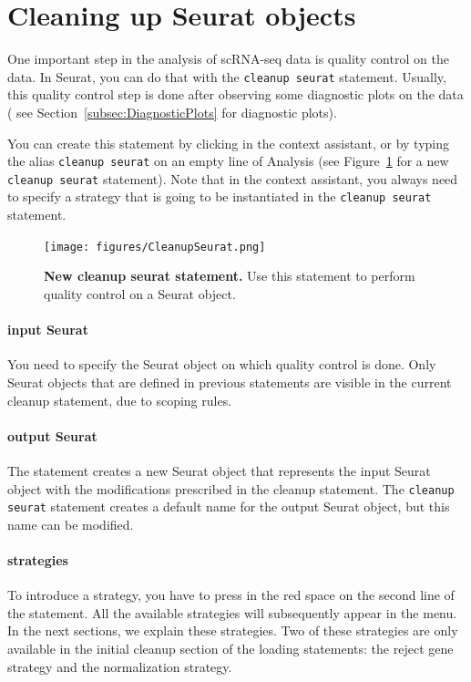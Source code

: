 \section{Cleaning up Seurat objects}\label{sec:CleanupSeurat}
One important step in the analysis of scRNA-seq data is quality control on the data. In
Seurat, you can do that with the \texttt{cleanup seurat} statement. Usually, this
quality control step is done after observing some diagnostic plots on the data (
see Section~\ref{subsec:DiagnosticPlots} for diagnostic plots).

You can create this statement by clicking  in the context assistant,
or by typing the alias \texttt{cleanup seurat} on an empty line of Analysis (see
Figure~\ref{fig:CleanupSeurat} for a new \texttt{cleanup seurat} statement). Note that in
the context assistant, you always need to specify a strategy that is going to be instantiated
in the \texttt{cleanup seurat} statement.

\begin{figure}[h!tbp]
  \centering
  \texttt{[image: figures/CleanupSeurat.png]}
    \caption[New cleanup seurat statement.]{\textbf{New cleanup seurat statement.}
    Use this statement to perform quality control on a Seurat object.}
\label{fig:CleanupSeurat}
\end{figure}

\paragraph{input Seurat} You need to specify the Seurat object on which quality control
is done. Only Seurat objects that are defined in previous statements are visible in the
current cleanup statement, due to scoping rules.

\paragraph{output Seurat} The statement creates a new Seurat object that represents the
input Seurat object with the modifications prescribed in the cleanup statement. The
\texttt{cleanup seurat} statement creates a default name for the output Seurat object,
but this name can be modified.

\paragraph{strategies} To introduce a strategy, you have to press \keys{\ctrl+\space}
in the red space on the second line of the statement. All the available strategies will
subsequently appear in the menu. In the next sections, we explain these strategies. Two
of these strategies are only available in the initial cleanup section of the loading
statements: the reject gene strategy and the normalization strategy.

